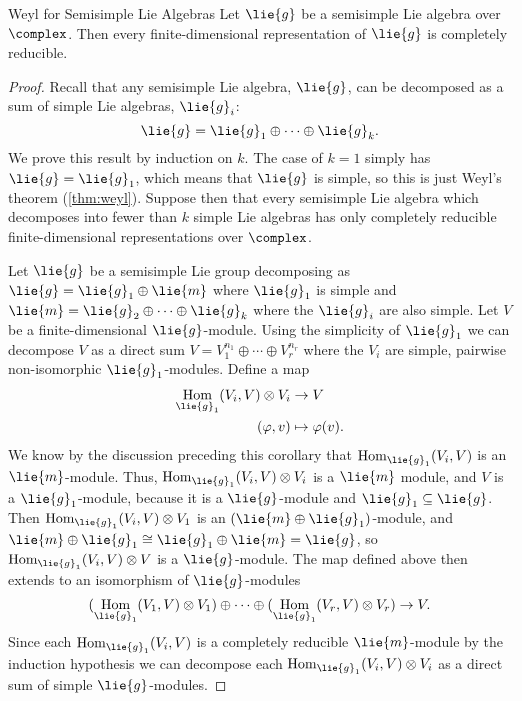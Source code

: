 \documentclass[fleqn]{NotesClass}
\DeclareMathOperator{\Hom}{Hom}
\newcommand{\isomorphic}{\cong}
\begin{document}
    \begin{crl}{Weyl for Semisimple Lie Algebras}{}
        Let \(\lie{g}\) be a semisimple Lie algebra over \(\complex\).
        Then every finite-dimensional representation of \(\lie{g}\) is completely reducible.
        \begin{proof}
            Recall that any semisimple Lie algebra, \(\lie{g}\), can be decomposed as a sum of simple Lie algebras, \(\lie{g}_i\):
            \begin{equation}
                \lie{g} = \lie{g}_1 \oplus \dotsb \oplus \lie{g}_k.
            \end{equation}
            We prove this result by induction on \(k\).
            The case of \(k = 1\) simply has \(\lie{g} = \lie{g}_1\), which means that \(\lie{g}\) is simple, so this is just Weyl's theorem (\cref{thm:weyl}).
            Suppose then that every semisimple Lie algebra which decomposes into fewer than \(k\) simple Lie algebras has only completely reducible finite-dimensional representations over \(\complex\).
            
            Let \(\lie{g}\) be a semisimple Lie group decomposing as \(\lie{g} = \lie{g}_1 \oplus \lie{m}\) where \(\lie{g}_1\) is simple and \(\lie{m} = \lie{g}_2 \oplus \dotsb \oplus \lie{g}_k\) where the \(\lie{g}_i\) are also simple.
            Let \(V\) be a finite-dimensional \(\lie{g}\)-module.
            Using the simplicity of \(\lie{g}_1\) we can decompose \(V\) as a direct sum \(V = V_1^{n_1} \oplus \dotsb \oplus V_r^{n_r}\) where the \(V_i\) are simple, pairwise non-isomorphic \(\lie{g}_1\)-modules.
            Define a map
            \begin{align}
                \Hom_{\lie{g}_1}(V_i, V) \otimes V_i &\to V\\
                (\varphi, v) &\mapsto \varphi(v).
            \end{align}
            We know by the discussion preceding this corollary that \(\Hom_{\lie{g}_1}(V_i, V)\) is an \(\lie{m}\)-module.
            Thus, \(\Hom_{\lie{g}_1}(V_i, V) \otimes V_i\) is a \(\lie{m}\) module, and \(V\) is a \(\lie{g}_1\)-module, because it is a \(\lie{g}\)-module and \(\lie{g}_1 \subseteq \lie{g}\).
            Then \(\Hom_{\lie{g}_1}(V_i, V) \otimes V_1\) is an \((\lie{m} \oplus \lie{g}_1)\)-module, and \(\lie{m} \oplus \lie{g}_1 \isomorphic \lie{g}_1 \oplus \lie{m} = \lie{g}\), so \(\Hom_{\lie{g}_1}(V_i, V) \otimes V\) is a \(\lie{g}\)-module.
            The map defined above then extends to an isomorphism of \(\lie{g}\)-modules
            \begin{equation}
                (\Hom_{\lie{g}_1}(V_1, V) \otimes V_1) \oplus \dotsb \oplus (\Hom_{\lie{g}_1}(V_r, V) \otimes V_r) \to V.
            \end{equation}
            Since each \(\Hom_{\lie{g}_1}(V_i, V)\) is a completely reducible \(\lie{m}\)-module by the induction hypothesis we can decompose each \(\Hom_{\lie{g}_1}(V_i, V) \otimes V_i\) as a direct sum of simple \(\lie{g}\)-modules.
        \end{proof}
    \end{crl}
    
\end{document}
